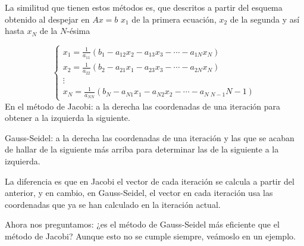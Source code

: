 La similitud que tienen estos métodos es, que descritos a partir del esquema obtenido al despejar en $Ax = b$ $x_1$ de la primera ecuación, $x_2$ de la segunda y así hasta $x_N$ de la $N$-ésima

\[ \left\{ \begin{array}{c}
x_1 = \frac{1}{a_{11}} (b_1 - a_{12}x_2 - a_{13}x_3 - \cdots - a_{1N}x_N) \\
x_2 = \frac{1}{a_{22}} (b_2 - a_{21}x_1 - a_{23}x_3 - \cdots - a_{2N}x_N) \\
\vdots \\
x_N = \frac{1}{a_{NN}} (b_N - a_{N1}x_1 - a_{N2}x_2 - \cdots - a_{N \; N-1}{N-1})
\end{array}
\right. \]
En el método de Jacobi: a la derecha las coordenadas de una iteración para obtener a la izquierda la siguiente.

Gauss-Seidel: a la derecha las coordenadas de una iteración y las que se acaban de hallar de la siguiente más arriba para determinar las de la siguiente a la izquierda.

La diferencia es que en Jacobi el vector de cada iteración se calcula a partir del anterior, y en cambio, en Gauss-Seidel, el vector en cada iteración usa las coordenadas que ya se han calculado en la iteración actual.

Ahora nos preguntamos: ¿es el método de Gauss-Seidel más eficiente que el método de Jacobi? Aunque esto no se cumple siempre, veámoslo en un ejemplo.

